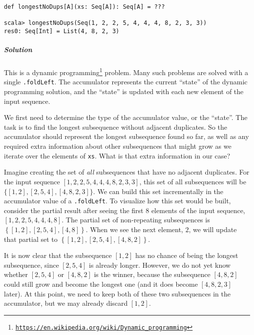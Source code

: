 \begin{lstlisting}
def longestNoDups[A](xs: Seq[A]): Seq[A] = ???

scala> longestNoDups(Seq(1, 2, 2, 5, 4, 4, 4, 8, 2, 3, 3))
res0: Seq[Int] = List(4, 8, 2, 3)
\end{lstlisting}


\subparagraph{Solution}

This is a dynamic programming\footnote{\texttt{\href{https://en.wikipedia.org/wiki/Dynamic_programming}{https://en.wikipedia.org/wiki/Dynamic\_programming}}}
problem. Many such problems are solved with a single \lstinline!.foldLeft!.
The accumulator represents the current ``state'' of the dynamic
programming solution, and the ``state'' is updated with each new
element of the input sequence.

We first need to determine the type of the accumulator value, or the
``state''. The task is to find the longest subsequence without adjacent
duplicates. So the accumulator should represent the longest subsequence
found so far, as well as any required extra information about other
subsequences that might grow as we iterate over the elements of \lstinline!xs!.
What is that extra information in our case? 

Imagine creating the set of \emph{all} subsequences that have no adjacent
duplicates. For the input sequence $\left[1,2,2,5,4,4,4,8,2,3,3\right]$,
this set of all subsequences will be $\{\left[1,2\right],\left[2,5,4\right],\left[4,8,2,3\right]\}$.
We can build this set incrementally in the accumulator value of a
\lstinline!.foldLeft!. To visualize how this set would be built,
consider the partial result after seeing the first $8$ elements of
the input sequence, $\left[1,2,2,5,4,4,4,8\right]$. The partial set
of non-repeating subsequences is $\left\{ \left[1,2\right],\left[2,5,4\right],\left[4,8\right]\right\} $.
When we see the next element, $2$, we will update that partial set
to $\left\{ \left[1,2\right],\left[2,5,4\right],\left[4,8,2\right]\right\} $.

It is now clear that the subsequence $\left[1,2\right]$ has no chance
of being the longest subsequence, since $\left[2,5,4\right]$ is already
longer. However, we do not yet know whether $\left[2,5,4\right]$
or $\left[4,8,2\right]$ is the winner, because the subsequence $\left[4,8,2\right]$
could still grow and become the longest one (and it does become $\left[4,8,2,3\right]$
later). At this point, we need to keep both of these two subsequences
in the accumulator, but we may already discard $\left[1,2\right]$.

